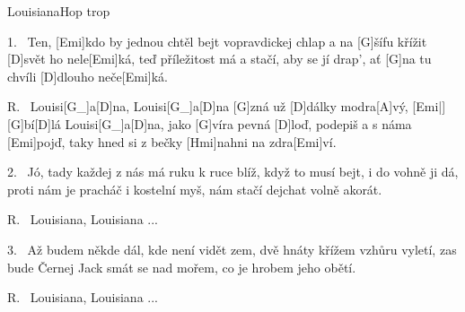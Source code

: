 \begin{song}{Louisiana}{Hop trop}

\begin{xverse}{1.~}
Ten, [\large Emi]kdo by jednou chtěl bejt vopravdickej chlap
a na [\large G]{šífu} křížit [\large D]svět ho nele[\large Emi]ká,
teď příležitost má a stačí, aby se jí drap',
ať [\large G]na tu chvíli [\large D]dlouho neče[\large Emi]ká.
\end{xverse}


\begin{xverse}{R.~}
Louisi[\large G_]{a}[\large D]{na}, Louisi[\large G_]a[\large D]na [\large G]zná už [\large D]dálky modra[\large A]vý, [\large Emi|]{}
[\large G]bí[\large D]lá Louisi[\large G_]a[\large D]na, jako [\large G]víra pevná [\large D]loď,
podepiš a s náma [\large Emi]pojď, taky hned si z bečky [\large Hmi]nahni na zdra[\large Emi]ví.
\end{xverse}


\begin{xverse}{2.~}
Jó, tady každej z nás má ruku k ruce blíž,
když to musí bejt, i do vohně ji dá,
proti nám je pracháč i kostelní myš,
nám stačí dejchat volně akorát.
\end{xverse}


\begin{xverse}{R.~}
Louisiana, Louisiana ...
\end{xverse}


\begin{xverse}{3.~}
Až budem někde dál, kde není vidět zem,
dvě hnáty křížem vzhůru vyletí,
zas bude Černej Jack smát se nad mořem,
co je hrobem jeho obětí.
\end{xverse}

\begin{xverse}{R.~}
Louisiana, Louisiana ...
\end{xverse}

\end{song}

